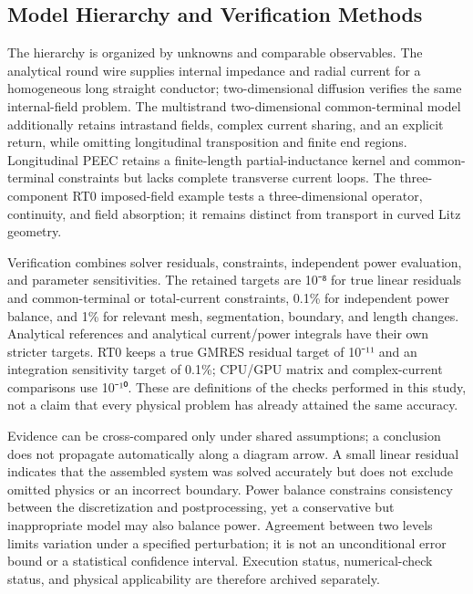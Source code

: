 \documentclass[11pt]{article}
\begin{document}
\subsection*{Model Hierarchy and Verification Methods}
\hypertarget{02.hierarchy.heading}{}
The hierarchy is organized by unknowns and comparable observables. The analytical round wire supplies internal impedance and radial current for a homogeneous long straight conductor; two-dimensional diffusion verifies the same internal-field problem. The multistrand two-dimensional common-terminal model additionally retains intrastand fields, complex current sharing, and an explicit return, while omitting longitudinal transposition and finite end regions. Longitudinal PEEC retains a finite-length partial-inductance kernel and common-terminal constraints but lacks complete transverse current loops. The three-component RT0 imposed-field example tests a three-dimensional operator, continuity, and field absorption; it remains distinct from transport in curved Litz geometry.


Verification combines solver residuals, constraints, independent power evaluation, and parameter sensitivities. The retained targets are 10⁻⁸ for true linear residuals and common-terminal or total-current constraints, 0.1\% for independent power balance, and 1\% for relevant mesh, segmentation, boundary, and length changes. Analytical references and analytical current/power integrals have their own stricter targets. RT0 keeps a true GMRES residual target of 10⁻¹¹ and an integration sensitivity target of 0.1\%; CPU/GPU matrix and complex-current comparisons use 10⁻¹⁰. These are definitions of the checks performed in this study, not a claim that every physical problem has already attained the same accuracy.


Evidence can be cross-compared only under shared assumptions; a conclusion does not propagate automatically along a diagram arrow. A small linear residual indicates that the assembled system was solved accurately but does not exclude omitted physics or an incorrect boundary. Power balance constrains consistency between the discretization and postprocessing, yet a conservative but inappropriate model may also balance power. Agreement between two levels limits variation under a specified perturbation; it is not an unconditional error bound or a statistical confidence interval. Execution status, numerical-check status, and physical applicability are therefore archived separately.
\end{document}
